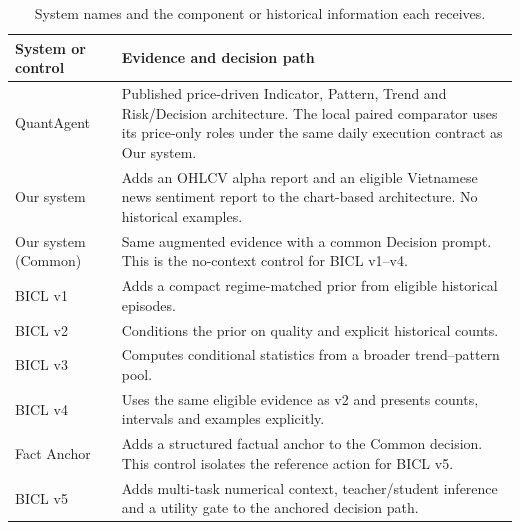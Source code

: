 \begin{table}[!htb]
\centering\small
\caption{System names and the component or historical information each receives.}\label{tab:system-versions}
\begin{tabularx}{\linewidth}{@{}lX@{}}\toprule
System or control & Evidence and decision path \\ \midrule
QuantAgent & Published price-driven Indicator, Pattern, Trend and Risk/Decision architecture. The local paired comparator uses its price-only roles under the same daily execution contract as Our system. \\
Our system & Adds an OHLCV alpha report and an eligible Vietnamese news sentiment report to the chart-based architecture. No historical examples. \\
Our system (Common) & Same augmented evidence with a common Decision prompt. This is the no-context control for BICL v1--v4. \\
BICL v1 & Adds a compact regime-matched prior from eligible historical episodes. \\
BICL v2 & Conditions the prior on quality and explicit historical counts. \\
BICL v3 & Computes conditional statistics from a broader trend--pattern pool. \\
BICL v4 & Uses the same eligible evidence as v2 and presents counts, intervals and examples explicitly. \\
Fact Anchor & Adds a structured factual anchor to the Common decision. This control isolates the reference action for BICL v5. \\
BICL v5 & Adds multi-task numerical context, teacher/student inference and a utility gate to the anchored decision path. \\
\bottomrule\end{tabularx}
\end{table}
